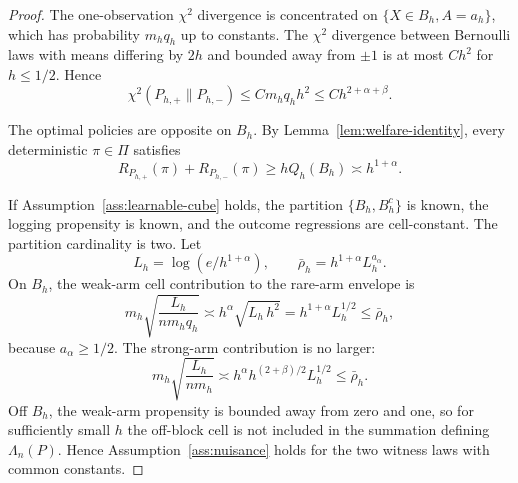 \documentclass[11pt]{article}
\theoremstyle{definition}
\theoremstyle{plain}
\theoremstyle{remark}
\begin{document}
\begin{proof}
The one-observation \(\chi^2\) divergence is concentrated on
\(\{X\in B_h,A=a_h\}\), which has probability \(m_h q_h\) up to constants.
The \(\chi^2\) divergence between Bernoulli laws with means differing by
\(2h\) and bounded away from \(\pm1\) is at most \(C h^2\) for
\(h\le1/2\).  Hence
\[
\chi^2(P_{h,+}\|P_{h,-})
\le C m_h q_h h^2
\le C h^{2+\alpha+\beta}.
\]

The optimal policies are opposite on \(B_h\).  By
Lemma~\ref{lem:welfare-identity}, every deterministic \(\pi\in\Pi\) satisfies
\[
R_{P_{h,+}}(\pi)+R_{P_{h,-}}(\pi)
\ge h Q_h(B_h)
\asymp h^{1+\alpha}.
\]

If Assumption~\ref{ass:learnable-cube} holds, the partition
\(\{B_h,B_h^c\}\) is known, the logging propensity is known, and the outcome
regressions are cell-constant.  The partition cardinality is two.  Let
\[
L_h=\log(e/h^{1+\alpha}),\qquad
\bar\rho_h=h^{1+\alpha}L_h^{a_\alpha}.
\]
On \(B_h\), the weak-arm cell contribution to the rare-arm envelope is
\[
m_h\sqrt{\frac{L_h}{n m_h q_h}}
\asymp
h^\alpha\sqrt{L_h\,h^2}
=
h^{1+\alpha}L_h^{1/2}
\le \bar\rho_h,
\]
because \(a_\alpha\ge1/2\).  The strong-arm contribution is no larger:
\[
m_h\sqrt{\frac{L_h}{n m_h}}
\asymp
h^\alpha h^{(2+\beta)/2}L_h^{1/2}
\le \bar\rho_h.
\]
Off \(B_h\), the weak-arm propensity is bounded away from zero and one, so
for sufficiently small \(h\) the off-block cell is not included in the
summation defining \(\Lambda_n(P)\).  Hence
Assumption~\ref{ass:nuisance} holds for the two witness laws with common
constants.
\end{proof}
\end{document}

